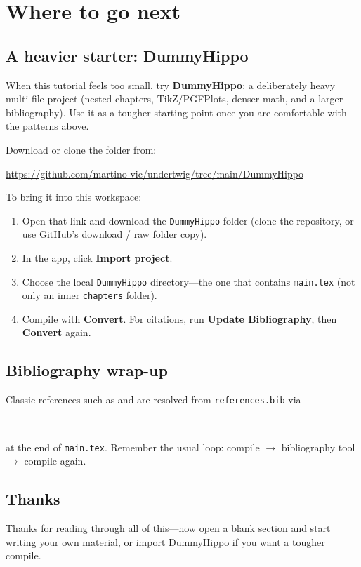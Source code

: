\section{Where to go next}
\label{sec:next}

\subsection{A heavier starter: DummyHippo}
When this tutorial feels too small, try \textbf{DummyHippo}: a deliberately
heavy multi-file project (nested chapters, TikZ/PGFPlots, denser math, and a
larger bibliography). Use it as a tougher starting point once you are
comfortable with the patterns above.

Download or clone the folder from:
\begin{center}
\url{https://github.com/martino-vic/undertwig/tree/main/DummyHippo}
\end{center}

To bring it into this workspace:
\begin{enumerate}
  \item Open that link and download the \texttt{DummyHippo} folder
        (clone the repository, or use GitHub's download / raw folder copy).
  \item In the app, click \textbf{Import project}.
  \item Choose the local \texttt{DummyHippo} directory---the one that contains
        \texttt{main.tex} (not only an inner \texttt{chapters} folder).
  \item Compile with \textbf{Convert}. For citations, run
        \textbf{Update Bibliography}, then \textbf{Convert} again.
\end{enumerate}

\subsection{Bibliography wrap-up}
Classic references such as \cite{lamport94} and \cite{knuth84} are resolved from
\texttt{references.bib} via
\begin{verbatim}


\end{verbatim}
at the end of \texttt{main.tex}. Remember the usual loop: compile $\to$
bibliography tool $\to$ compile again.

\subsection{Thanks}
Thanks for reading through all of this---now open a blank section and start
writing your own material, or import DummyHippo if you want a tougher compile.
